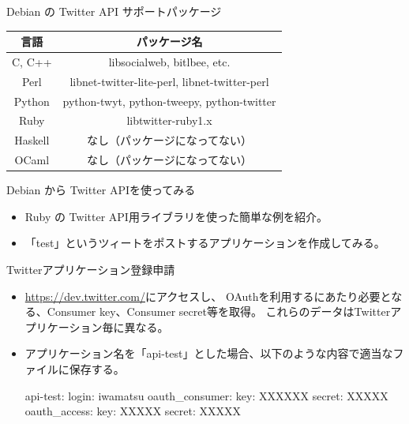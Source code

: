 \begin{frame}{Debian の Twitter API サポートパッケージ}

\begin{table}[ht]
\begin{center}
  \begin{tabular}{|c|c|}
 \hline
 言語 & パッケージ名 \\
 \hline
 C, C++ & libsocialweb, bitlbee, etc. \\
 Perl & libnet-twitter-lite-perl, libnet-twitter-perl \\
 Python & python-twyt, python-tweepy, python-twitter \\
 Ruby & libtwitter-ruby1.x \\
 Haskell & なし（パッケージになってない） \\
 OCaml & なし（パッケージになってない） \\
 \hline
 \end{tabular}
\end{center}
\end{table}

\end{frame}



\begin{frame}{Debian から Twitter APIを使ってみる}

\begin{itemize}
\item Ruby の Twitter API用ライブラリを使った簡単な例を紹介。
\item 「test」というツィートをポストするアプリケーションを作成してみる。
\end{itemize}

\end{frame}

\begin{frame}[containsverbatim]{Twitterアプリケーション登録申請}

\begin{itemize}
\item \url{https://dev.twitter.com/}にアクセスし、
OAuthを利用するにあたり必要となる、Consumer key、Consumer secret等を取得。
これらのデータはTwitterアプリケーション毎に異なる。
\item アプリケーション名を「api-test」とした場合、以下のような内容で適当なファイルに保存する。
\begin{commandline}
api-test:
    login: iwamatsu
    oauth_consumer:
        key: XXXXXX
        secret: XXXXX
    oauth_access:
        key: XXXXX
        secret: XXXXX
\end{commandline}
\end{itemize}

\end{frame}

